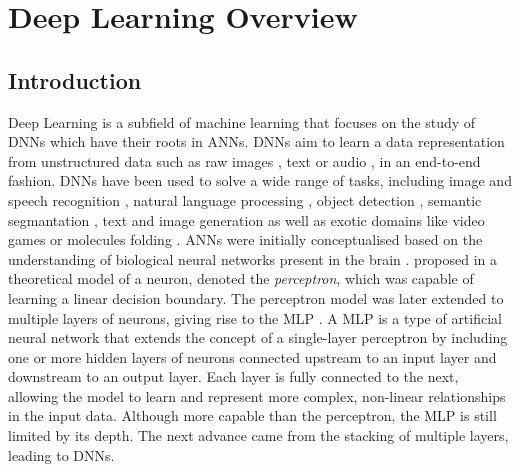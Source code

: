 \chapter{Deep Learning Overview}\label{chap:dlo}

\localtableofcontents

\section{Introduction}

Deep Learning is a subfield of machine learning that focuses on the study of
\acp{DNN} which have their roots in \acp{ANN}. \acp{DNN} aim to learn a data
representation from unstructured data such as raw images
\cite{DBLP:conf/nips/KrizhevskySH12}, text
\cite{DBLP:conf/emnlp/BudzianowskiV19} or audio
\cite{DBLP:journals/corr/HannunCCCDEPSSCN14}, in an end-to-end fashion.
\acp{DNN} have been used to solve a wide range of tasks, including image and
speech recognition
\cite{DBLP:conf/nips/KrizhevskySH12,DBLP:journals/corr/SimonyanZ14a,DBLP:conf/cvpr/HeZRS16,DBLP:journals/corr/HannunCCCDEPSSCN14,DBLP:conf/icassp/ChanJLV16,DBLP:conf/icml/AmodeiABCCCCCCD16},
natural language processing
\cite{DBLP:conf/emnlp/BudzianowskiV19,DBLP:conf/naacl/DevlinCLT19,DBLP:conf/nips/VaswaniSPUJGKP17},
object detection \cite{DBLP:conf/cvpr/RedmonDGF16,DBLP:conf/nips/RenHGS15},
semantic segmantation \cite{long2015fully,DBLP:conf/cvpr/LiuCSAHY019}, text and
image generation
\cite{goodfellow2020generative,karras2019style,DBLP:conf/emnlp/BudzianowskiV19}
as well as exotic domains like video games
\cite{silver2016mastering,silver2018general} or molecules folding
\cite{jumper2021highly}. \acp{ANN} were initially conceptualised based on the
understanding of biological neural networks present in the brain
\cite{mcculloch1943logical,hebb2005organization}.
\citeauthor{rosenblatt1958perceptron} proposed in
\cite{rosenblatt1958perceptron} a theoretical model of a neuron, denoted the
\emph{perceptron}, which was capable of learning a linear decision boundary. The
perceptron model was later extended to multiple layers of neurons, giving rise
to the \ac{MLP} \cite{rosenblatt1961principles,rumelhart1986learning}. A
\acl{MLP} is a type of artificial neural network that extends the concept of a
single-layer perceptron by including one or more hidden layers of neurons
connected upstream to an input layer and downstream to an output layer. Each
layer is fully connected to the next, allowing the model to learn and represent
more complex, non-linear relationships in the input data. Although more capable
than the perceptron, the \ac{MLP} is still limited by its depth. The next
advance came from the stacking of multiple layers, leading to \aclp{DNN}.\\


